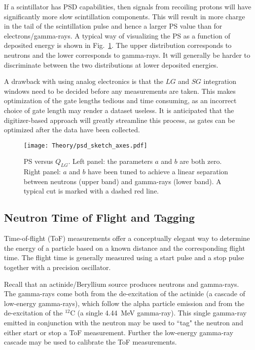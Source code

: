 \documentclass[main.tex]{subfiles}
\begin{document}
If a scintillator has PSD capabilities, then signals from recoiling protons will have significantly more slow scintillation components. This will result in more charge in the tail of the scintillation pulse and hence a larger PS value than for electrons/gamma-rays. A typical way of visualizing the PS as a function of deposited energy is shown in Fig.~\ref{fig:psd_sketch}. The upper distribution corresponds to neutrons and the lower corresponds to gamma-rays. It will generally be harder to discriminate between the two distributions at lower deposited energies.

A drawback with using analog electronics is that the $LG$ and $SG$ integration windows need to be decided before any measurements are taken. This makes optimization of the gate lengths tedious and time consuming, as an incorrect choice of gate length may render a dataset useless. It is anticipated that the digitizer-based approach will greatly streamline this process, as gates can be optimized after the data have been collected.
\begin{figure}[ht]
    \centering
        \texttt{[image: Theory/psd\_sketch\_axes.pdf]}
        \caption[PS versus $Q_{LG}$]{PS versus $Q_{LG}$. Left panel: the parameters $a$ and $b$ are both zero. Right panel: $a$ and $b$ have been tuned to achieve a linear separation between neutrons (upper band) and gamma-rays (lower band). A typical cut is marked with a dashed red line.}
    \label{fig:psd_sketch} 
\end{figure}


\subsection{Neutron Time of Flight and Tagging}\label{sec:tof}
Time-of-flight (ToF) measurements offer a conceptually elegant way to determine the energy of a particle based on a known distance and the corresponding flight time. The flight time is generally measured using a start pulse and a stop pulse together with a precision oscillator.

Recall that an actinide/Beryllium source produces neutrons and gamma-rays. The gamma-rays come both from the de-excitation of the actinide (a cascade of low-energy gamma-rays), which follow the alpha particle emission and from the de-excitation of the $^\textrm{12}$C (a single \SI{4.44}{\MeV} gamma-ray). This single gamma-ray emitted in conjunction with the neutron may be used to ``tag" the neutron and either start or stop a ToF measurement. Further the low-energy gamma-ray cascade may be used to calibrate the ToF measurements.
\end{document}
